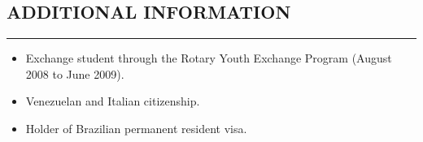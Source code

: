 \documentclass[11pt,letterpaper]{article}
\begin{document}
\subsection*{ADDITIONAL INFORMATION}
	\vspace{-0.5em}
	\hrule
	\vspace{0.8em}
	\begin{itemize}
		\item Exchange student through the Rotary Youth Exchange Program (August 2008 to June 2009).
		\item Venezuelan and Italian citizenship.
		\item Holder of Brazilian permanent resident visa.
	\end{itemize}
	
	
\end{document}
